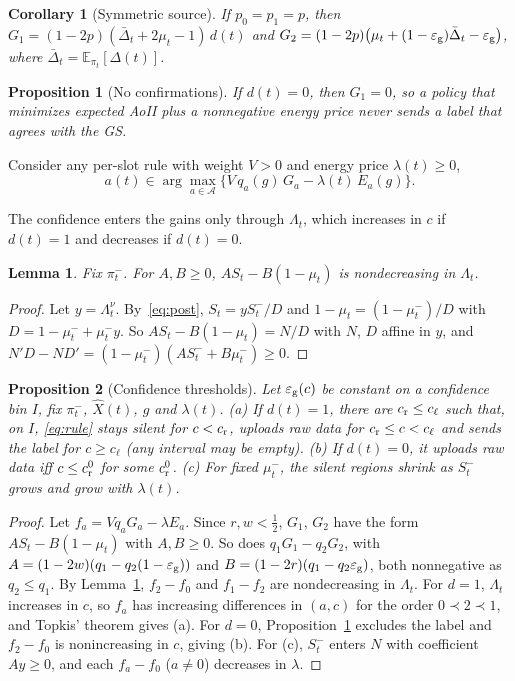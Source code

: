 \documentclass[conference]{IEEEtran}
\newtheorem{lemma}{Lemma}
\newtheorem{proposition}{Proposition}
\newtheorem{corollary}{Corollary}
\theoremstyle{remark}
\newcommand{\E}{\mathbb{E}}
\newcommand{\A}{\mathcal{A}}
\newcommand{\lab}{\ell}
\newcommand{\Dbar}{\bar{\Delta}}
\newcommand{\ee}{\varepsilon}
\begin{document}
\begin{corollary}[Symmetric source]\label{cor:sym}
If $p_0=p_1=p$, then $G_1=(1-2p)(\Dbar_t+2\mu_t-1)\,d(t)$ and $G_2=(1-2p)\big(\mu_t+(1-\ee_{\rm g})\Dbar_t-\ee_{\rm g}\big)$, where $\Dbar_t=\E_{\pi_t}[\Delta(t)]$.
\end{corollary}

\begin{proposition}[No confirmations]\label{prop:confirm}
If $d(t)=0$, then $G_1=0$, so a policy that minimizes expected AoII plus a nonnegative energy price never sends a label that agrees with the GS.
\end{proposition}

Consider any per-slot rule with weight $V>0$ and energy price $\lambda(t)\ge0$,
\begin{equation}\label{eq:rule}
a(t)\in\arg\max_{a\in\A}\big\{V\,q_a(g)\,G_a-\lambda(t)\,E_a(g)\big\}.
\end{equation}

The confidence enters the gains only through $\Lambda_t$, which increases in $c$ if $d(t)=1$ and decreases if $d(t)=0$.

\begin{lemma}\label{lem:mono}
Fix $\pi^-_t$. For $A,B\ge0$, $AS_t-B(1-\mu_t)$ is nondecreasing in $\Lambda_t$.
\end{lemma}
\begin{proof}
Let $y=\Lambda_t^{\nu}$. By~\eqref{eq:post}, $S_t=yS^-_t/D$ and $1-\mu_t=(1-\mu^-_t)/D$ with $D=1-\mu^-_t+\mu^-_ty$. So $AS_t-B(1-\mu_t)=N/D$ with $N$, $D$ affine in $y$, and $N'D-ND'=(1-\mu^-_t)(AS^-_t+B\mu^-_t)\ge0$.
\end{proof}

\begin{proposition}[Confidence thresholds]\label{prop:threshold}
Let $\ee_{\rm g}(c)$ be constant on a confidence bin $I$, fix $\pi^-_t$, $\hat X(t)$, $g$ and $\lambda(t)$. (a) If $d(t)=1$, there are $c_{\rm r}\le c_{\lab}$ such that, on $I$, \eqref{eq:rule} stays silent for $c<c_{\rm r}$, uploads raw data for $c_{\rm r}\le c<c_{\lab}$ and sends the label for $c\ge c_{\lab}$ (any interval may be empty). (b) If $d(t)=0$, it uploads raw data iff $c\le c^0_{\rm r}$ for some $c^0_{\rm r}$. (c) For fixed $\mu^-_t$, the silent regions shrink as $S^-_t$ grows and grow with $\lambda(t)$.
\end{proposition}
\begin{proof}
Let $f_a=Vq_aG_a-\lambda E_a$. Since $r,w<\tfrac12$, $G_1$, $G_2$ have the form $AS_t-B(1-\mu_t)$ with $A,B\ge0$. So does $q_1G_1-q_2G_2$, with $A=(1-2w)(q_1-q_2(1-\ee_{\rm g}))$ and $B=(1-2r)(q_1-q_2\ee_{\rm g})$, both nonnegative as $q_2\le q_1$. By Lemma~\ref{lem:mono}, $f_2-f_0$ and $f_1-f_2$ are nondecreasing in $\Lambda_t$. For $d=1$, $\Lambda_t$ increases in $c$, so $f_a$ has increasing differences in $(a,c)$ for the order $0\prec2\prec1$, and Topkis' theorem gives (a). For $d=0$, Proposition~\ref{prop:confirm} excludes the label and $f_2-f_0$ is nonincreasing in $c$, giving (b). For (c), $S^-_t$ enters $N$ with coefficient $Ay\ge0$, and each $f_a-f_0$ ($a\neq0$) decreases in $\lambda$.
\end{proof}
\end{document}
